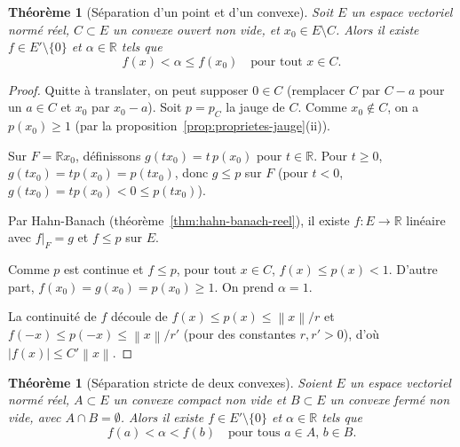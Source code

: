 \documentclass[a4paper,12pt]{book}
\newcommand{\R}{\mathbb{R}}
\newcommand{\norm}[1]{\left\| #1 \right\|}
\newcommand{\abs}[1]{\left| #1 \right|}
\theoremstyle{definition}
\theoremstyle{plain}
\newtheorem{theoreme}[definition]{Théorème}
\theoremstyle{remark}
\begin{document}
\begin{theoreme}[Séparation d'un point et d'un convexe]\label{thm:separation-point-convexe}
Soit $E$ un espace vectoriel normé réel, $C \subset E$ un convexe ouvert non vide, et
$x_0 \in E \setminus C$. Alors il existe $f \in E' \setminus \{0\}$ et $\alpha \in \R$
tels que
\[
    f(x) < \alpha \leq f(x_0) \quad \text{pour tout } x \in C.
\]
\end{theoreme}

\begin{proof}
Quitte à translater, on peut supposer $0 \in C$ (remplacer $C$ par $C - a$ pour un
$a \in C$ et $x_0$ par $x_0 - a$). Soit $p = p_C$ la jauge de $C$.
Comme $x_0 \notin C$, on a $p(x_0) \geq 1$ (par la
proposition~\ref{prop:proprietes-jauge}(ii)).

Sur $F = \R x_0$, définissons $g(tx_0) = t\, p(x_0)$ pour $t \in \R$.
Pour $t \geq 0$, $g(tx_0) = tp(x_0) = p(tx_0)$, donc $g \leq p$ sur $F$ (pour $t<0$,
$g(tx_0) = tp(x_0) < 0 \leq p(tx_0)$).

Par Hahn-Banach (théorème~\ref{thm:hahn-banach-reel}), il existe $f : E \to \R$
linéaire avec $f|_F = g$ et $f \leq p$ sur $E$.

Comme $p$ est continue et $f \leq p$, pour tout $x \in C$, $f(x) \leq p(x) < 1$.
D'autre part, $f(x_0) = g(x_0) = p(x_0) \geq 1$.
On prend $\alpha = 1$.

La continuité de $f$ découle de $f(x) \leq p(x) \leq \norm{x}/r$ et
$f(-x) \leq p(-x) \leq \norm{x}/r'$ (pour des constantes $r, r' > 0$), d'où
$\abs{f(x)} \leq C'\norm{x}$.
\end{proof}

\begin{theoreme}[Séparation stricte de deux convexes]\label{thm:separation-stricte}
Soient $E$ un espace vectoriel normé réel, $A \subset E$ un convexe compact non vide et
$B \subset E$ un convexe fermé non vide, avec $A \cap B = \emptyset$. Alors il existe
$f \in E' \setminus \{0\}$ et $\alpha \in \R$ tels que
\[
    f(a) < \alpha < f(b) \quad \text{pour tous } a \in A,\, b \in B.
\]
\end{theoreme}
\end{document}
